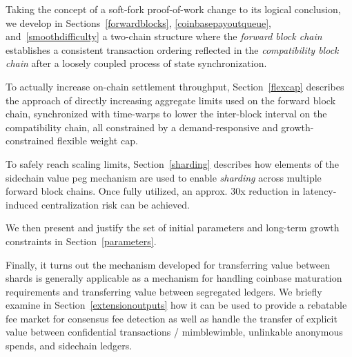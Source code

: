 Taking the concept of a soft-fork proof-of-work change to its logical
conclusion, we develop in Sections~\ref{forwardblocks},
\ref{coinbasepayoutqueue}, and~\ref{smoothdifficulty} a two-chain
structure where the \emph{forward block chain} establishes a
consistent transaction ordering reflected in the \emph{compatibility
  block chain} after a loosely coupled process of state
synchronization.

To actually increase on-chain settlement throughput,
Section~\ref{flexcap} describes the approach of directly increasing
aggregate limits used on the forward block chain, synchronized with
time-warps to lower the inter-block interval on the compatibility
chain, all constrained by a demand-responsive and growth-constrained
flexible weight cap.

To safely reach scaling limits, Section~\ref{sharding} describes how
elements of the sidechain value peg mechanism are used to enable
\emph{sharding} across multiple forward block chains.  Once fully
utilized, an approx. \num{30}x reduction in latency-induced
centralization risk can be achieved.

We then present and justify the set of initial parameters and
long-term growth constraints in Section~\ref{parameters}.

Finally, it turns out the mechanism developed for transferring value
between shards is generally applicable as a mechanism for handling
coinbase maturation requirements and transferring value between
segregated ledgers.  We briefly examine in
Section~\ref{extensionoutputs} how it can be used to provide a
rebatable fee market for consensus fee detection as well as handle
the transfer of explicit value between confidential transactions /
mimblewimble, unlinkable anonymous spends, and sidechain ledgers.
